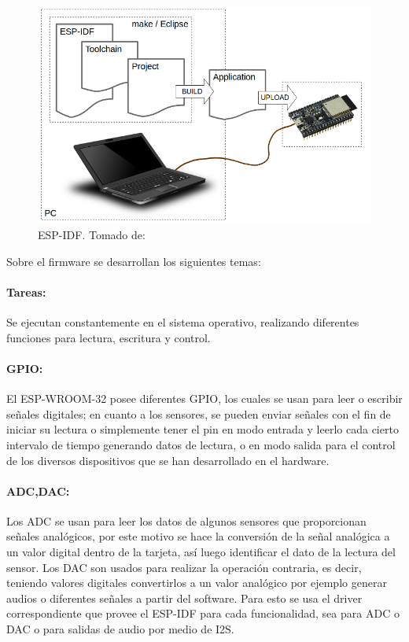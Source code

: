 \begin{figure}[H]
	\centering
	\caption{ESP-IDF. Tomado de: \cite{ES}}
	\label{fig:what-you-need}
	\includegraphics[width=0.5\linewidth]{Imagenes/what-you-need}
\end{figure}


Sobre el firmware se desarrollan los siguientes temas:

\paragraph{Tareas:}

Se ejecutan constantemente en el sistema operativo, realizando diferentes funciones para lectura, escritura y control.

\paragraph{GPIO:}

El ESP-WROOM-32 posee diferentes GPIO, los cuales se usan para leer o escribir señales digitales; en cuanto a los sensores, se pueden enviar señales con el fin de iniciar su lectura o simplemente tener el pin en modo entrada y leerlo cada cierto intervalo de tiempo generando datos de lectura, o en modo salida para el control de los diversos dispositivos que se han desarrollado en el hardware.

\paragraph{ADC,DAC:}

Los ADC se usan para leer los datos de algunos sensores que proporcionan señales analógicos, por este motivo se hace la conversión de la señal analógica a un valor digital dentro de la tarjeta, así luego identificar el dato de la lectura del sensor. Los DAC son usados para realizar la operación contraria, es decir, teniendo valores digitales convertirlos a un valor analógico por ejemplo generar audios o diferentes señales a partir del software. Para esto se usa el driver correspondiente que provee el ESP-IDF para cada funcionalidad, sea para ADC o DAC o para salidas de audio por medio de I2S.

